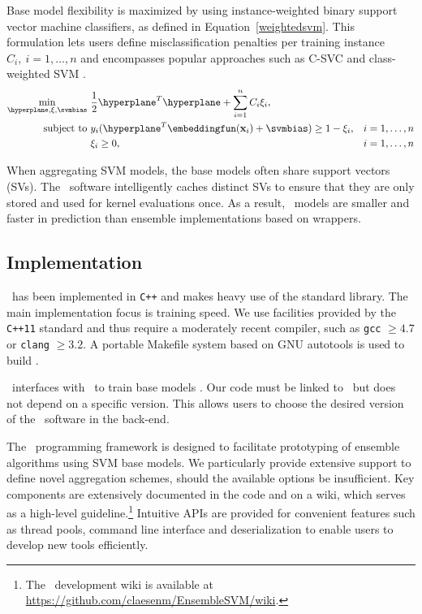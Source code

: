 Base model flexibility is maximized by using instance-weighted binary support
vector machine classifiers, as defined in Equation~\eqref{weightedsvm}. This formulation lets users define
misclassification penalties per training instance $C_i,\ i=1,\ldots,n$ and
encompasses popular approaches such as C-SVC and class-weighted SVM
\citep{Cortes:1995:SN:218919.218929, osuna1997}.
\begin{align}
\mathbf{\min_{\hyperplane,\mathbf{\xi},\svmbias} } \ &
\frac{1}{2}\hyperplane^T\hyperplane+\sum_{i=1}^n C_i \xi_i,
\label{weightedsvm} \\
\text{subject\ to }  &y_i(\hyperplane^T\embeddingfun(\mathbf{x}_i)+\svmbias)\geq 1-\xi_i,
&i=1,\ldots,n \nonumber \\
&\xi_i \geq 0, &i=1,\ldots,n \nonumber  
\end{align}

When aggregating SVM models, the base models often share support
vectors (SVs). The \esvm\ software intelligently caches distinct SVs to ensure
that they are only stored and used for kernel evaluations once. As a result,
\esvm\ models are smaller and faster in prediction than ensemble implementations based on wrappers.

\subsection{Implementation}
\esvm\ has been implemented in \texttt{C++} and makes heavy use of the standard library. The main implementation focus is training speed. We use facilities provided by the \texttt{C++11} standard and thus require a moderately recent compiler, such as \texttt{gcc} $\geq4.7$ or \texttt{clang} $\geq 3.2$. A portable Makefile system based on GNU autotools is used to build \esvm. 

\esvm\ interfaces with \libsvm\ to train base models \citep{CC01a}. Our code must be linked to \libsvm\ but does not depend on a specific version. This allows users to choose the desired version of the \libsvm\ software in the back-end. 

The \esvm\ programming framework is designed to facilitate prototyping of ensemble algorithms using SVM base models.
We particularly provide extensive support to define novel aggregation schemes, should the available options be insufficient. 
Key components are extensively documented in the code and on a wiki, which serves as a high-level guideline.\footnote{The \esvm\ development wiki is available at \url{https://github.com/claesenm/EnsembleSVM/wiki}.} Intuitive APIs are provided for convenient features such as thread pools, command line interface and deserialization to enable users to develop new tools efficiently.

